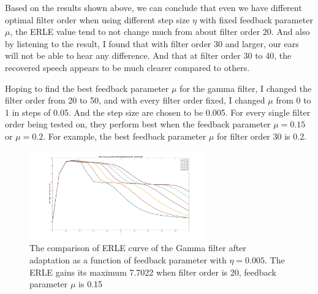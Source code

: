 \documentclass[conference]{IEEEtran}
\begin{document}
	
	Based on the results shown above, we can conclude that even we have different optimal filter order when using different step size $\eta$ with fixed feedback parameter $\mu$, the ERLE value tend to not change much from about filter order 20. And also by listening to the result, I found that with filter order 30 and larger, our ears will not be able to hear any difference. And that at filter order 30 to 40, the recovered speech appears to be much clearer compared to others.
	
	Hoping to find the best feedback parameter $\mu$ for the gamma filter, I changed the filter order from 20 to 50, and with every filter order fixed,  I changed $\mu$ from 0 to 1 in steps of 0.05. And the step size are chosen to be 0.005.  For every single filter order being tested on, they perform best when the feedback parameter $\mu = 0.15$ or $\mu = 0.2$. For example, the best feedback parameter $\mu$ for filter order 30 is 0.2. 
	\begin{figure}[h]
	\centerline{\includegraphics[width=3in]{ERLEcomparisonfor_bestmu_0001.jpg}}
	\caption{The comparison of ERLE curve of the Gamma filter after adaptation as a function of feedback parameter with $\eta = 0.005$.  The ERLE gains its maximum 7.7022 when filter order is 20, feedback parameter $\mu$ is 0.15}
	\label{ERLEComp}
	\end{figure}
\end{document}
